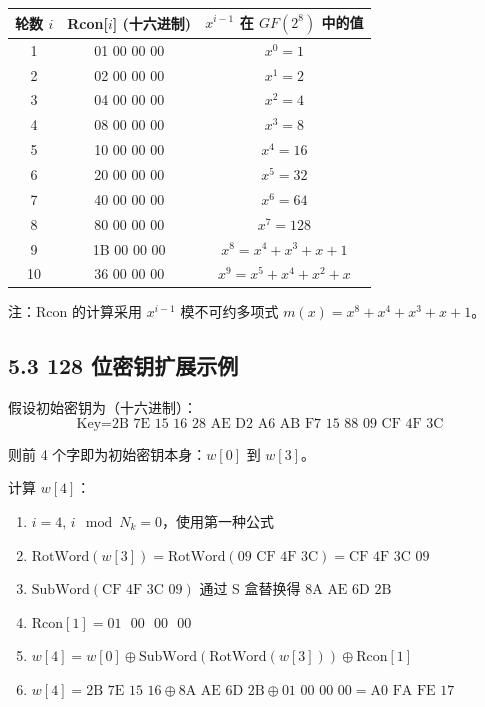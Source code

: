 \documentclass[12pt, a4paper]{article}
\begin{document}
\begin{tcolorbox}[notebox=Rcon 表格]
\begin{center}
\begin{tabular}{c|c|c}
\hline
\textbf{轮数 $i$} & \textbf{Rcon[$i$]} (十六进制) & \textbf{$x^{i-1}$ 在 $GF(2^8)$ 中的值} \\
\hline
1 & 01 00 00 00 & $x^0 = 1$ \\
2 & 02 00 00 00 & $x^1 = 2$ \\
3 & 04 00 00 00 & $x^2 = 4$ \\
4 & 08 00 00 00 & $x^3 = 8$ \\
5 & 10 00 00 00 & $x^4 = 16$ \\
6 & 20 00 00 00 & $x^5 = 32$ \\
7 & 40 00 00 00 & $x^6 = 64$ \\
8 & 80 00 00 00 & $x^7 = 128$ \\
9 & 1B 00 00 00 & $x^8 = x^4 + x^3 + x + 1$ \\
10 & 36 00 00 00 & $x^9 = x^5 + x^4 + x^2 + x$ \\
\hline
\end{tabular}
\end{center}
\end{tcolorbox}

注：Rcon 的计算采用 $x^{i-1}$ 模不可约多项式 $m(x) = x^8 + x^4 + x^3 + x + 1$。

\subsection{5.3 128 位密钥扩展示例}

假设初始密钥为（十六进制）：
$$
\text{Key} = \text{2B 7E 15 16 28 AE D2 A6 AB F7 15 88 09 CF 4F 3C}
$$

则前 4 个字即为初始密钥本身：$w[0]$ 到 $w[3]$。

计算 $w[4]$：
\begin{enumerate}
    \item $i = 4$, $i \mod N_k = 0$，使用第一种公式
    \item $\text{RotWord}(w[3]) = \text{RotWord}(09\text{ CF } 4\text{F } 3\text{C}) = \text{CF } 4\text{F } 3\text{C } 09$
    \item $\text{SubWord}(\text{CF } 4\text{F } 3\text{C } 09)$ 通过 S 盒替换得 $\text{8A } \text{AE } \text{6D } \text{2B}$
    \item $\text{Rcon}[1] = 01\text{ }00\text{ }00\text{ }00$
    \item $w[4] = w[0] \oplus \text{SubWord}(\text{RotWord}(w[3])) \oplus \text{Rcon}[1]$
    \item $w[4] = \text{2B 7E 15 16} \oplus \text{8A AE 6D 2B} \oplus \text{01 00 00 00} = \text{A0 FA FE 17}$
\end{enumerate}
\end{document}
